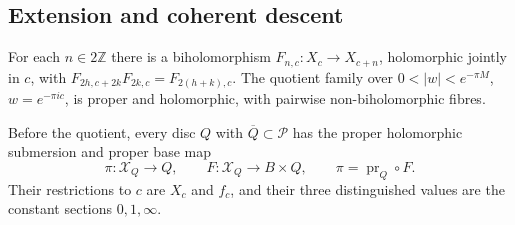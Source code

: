 \subsection{Extension and coherent descent}\hypertarget{tag-01PC}{}\label{fam:section:A.3}

\begin{proposition}\hypertarget{tag-01Q2}{}\label{fam:src:A.3.1}\label{fam:st:A.3.1}

For each $n\in2\mathbb Z$ there is a biholomorphism $F_{n,c}:X_c\to X_{c+n}$, holomorphic jointly in $c$, with $F_{2h,c+2k}F_{2k,c}=F_{2(h+k),c}$. The quotient family over $0<|w|<e^{-\pi M}$, $w=e^{-\pi ic}$, is proper and holomorphic, with pairwise non-biholomorphic fibres.

Before the quotient, every disc $Q$ with $\overline Q\subset\mathcal P$
has the proper holomorphic submersion and proper base map
\[
 \pi:\mathcal X_Q\longrightarrow Q,\qquad
 F:\mathcal X_Q\longrightarrow B\times Q,\qquad
 \pi=\operatorname{pr}_Q\circ F.
 \tag{PD2}
\]
Their restrictions to $c$ are $X_c$ and $f_c$, and their three
distinguished values are the constant sections $0,1,\infty$.
\end{proposition}
